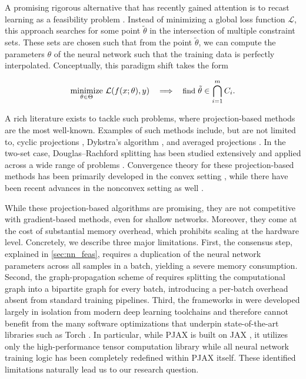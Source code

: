 \documentclass{article}
\DeclareMathOperator*{\minimize}{minimize}
\theoremstyle{plain}
\theoremstyle{definition}
\theoremstyle{remark}
\begin{document}
A promising rigorous alternative that has recently gained attention is to recast learning as a feasibility problem \cite{elser2019learning, bergmeister2025projection, elser2026learning}. Instead of minimizing a global loss function $\mathcal{L}$, this approach searches for some point $\tilde{\theta}$ in the intersection of multiple constraint sets. These sets are chosen such that from the point $\tilde{\theta}$, we can compute the parameters $\theta$ of the neural network such that the training data is perfectly interpolated. Conceptually, this paradigm shift takes the form
\begin{tcolorbox}
\[
\small
\minimize_{\theta \in \Theta}\, \mathcal{L}(f(x;\theta), y)
\quad \Longrightarrow \quad
\textnormal{find } \tilde{\theta} \in \bigcap_{i=1}^{m} C_i.
\]\end{tcolorbox}
A rich literature exists to tackle such problems, where projection-based methods are the most well-known. Examples of such methods include, but are not limited to, cyclic projections \cite{gubin1967method}, Dykstra's algorithm \cite{dykstra1983algorithm}, and averaged projections \cite{}. In the two-set case, Douglas--Rachford splitting \cite{} has been studied extensively and applied across a wide range of problems \cite{bauschke2021douglasrachfordalgorithmsolvingpossibly, lindstrom2020surveyyearsdouglasrachford}. Convergence theory for these projection-based methods has been primarily developed in the convex setting \cite{}, while there have been recent advances in the nonconvex setting as well \cite{}.

While these projection-based algorithms are promising, they are not competitive with gradient-based methods, even for shallow networks. Moreover, they come at the cost of substantial memory overhead, which prohibits scaling at the hardware level. Concretely, we describe three major limitations. First, the consensus step, explained in \cref{sec:nn_feas}, requires a duplication of the neural network parameters across all samples in a batch, yielding a severe memory consumption. Second, the graph-propagation scheme of \cite{bergmeister2025projection} requires splitting the computational graph into a bipartite graph for every batch, introducing a per-batch overhead absent from standard training pipelines. Third, the frameworks in \cite{elser2019learning,bergmeister2025projection} were developed largely in isolation from modern deep learning toolchains and therefore cannot benefit from the many software optimizations that underpin state-of-the-art libraries such as Torch \cite{paszke2019pytorchimperativestylehighperformance}. In particular, while PJAX \cite{bergmeister2025projection} is built on JAX \cite{}, it utilizes only the high-performance tensor computation library while all neural network training logic has been completely redefined within PJAX itself. These identified limitations naturally lead us to our research question.
\end{document}
